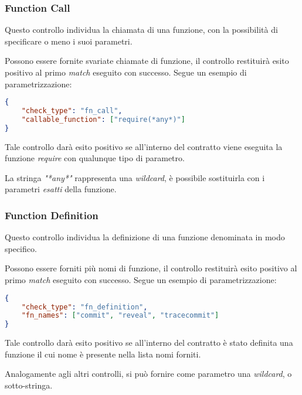 \subsubsection{Function Call}
Questo controllo individua la chiamata di una funzione, con la possibilità di specificare o meno i suoi parametri.\par
Possono essere fornite svariate chiamate di funzione, il controllo restituirà esito positivo al primo \textit{match} eseguito con successo.
Segue un esempio di parametrizzazione:
{\begin{lstlisting}[language=json, caption={Parametrizzazione del controllo Function Call}]
{
	"check_type": "fn_call",
	"callable_function": ["require(*any*)"]
}\end{lstlisting}}
\noindent Tale controllo darà esito positivo se all'interno del contratto viene eseguita la funzione \textit{require} con qualunque tipo di parametro.\par
La stringa \textit{"*any*"} rappresenta una \textit{wildcard}, è possibile sostituirla con i parametri \textit{esatti} della funzione.

\subsubsection{Function Definition}
Questo controllo individua la definizione di una funzione denominata in modo specifico.\par
Possono essere forniti più nomi di funzione, il controllo restituirà esito positivo al primo \textit{match} eseguito con successo.
Segue un esempio di parametrizzazione:
{\begin{lstlisting}[language=json, caption={Parametrizzazione del controllo Function Definition}]
{
	"check_type": "fn_definition",
	"fn_names": ["commit", "reveal", "tracecommit"]
}\end{lstlisting}}
\noindent Tale controllo darà esito positivo se all'interno del contratto è stato definita una funzione il cui nome è presente nella lista nomi forniti.\par
Analogamente agli altri controlli, si può fornire come parametro una \textit{wildcard}, o sotto-stringa.

